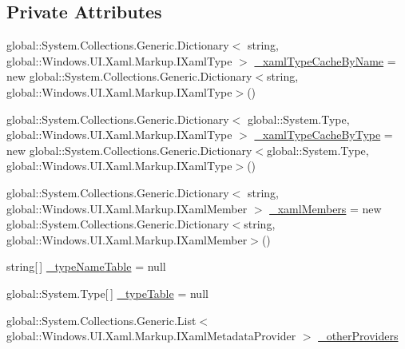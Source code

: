 \subsection*{Private Attributes}
\begin{CompactItemize}
\item 
global::System.Collections.Generic.Dictionary$<$ string, global::Windows.UI.Xaml.Markup.IXamlType $>$ \hyperlink{class__2doo_1_1_u_w_p_1_1__2doo___u_w_p___xaml_type_info_1_1_xaml_type_info_provider_5d88548b5b6d2a0898199478cd6b61a8}{\_\-xamlTypeCacheByName} = new global::System.Collections.Generic.Dictionary$<$string, global::Windows.UI.Xaml.Markup.IXamlType$>$()
\item 
global::System.Collections.Generic.Dictionary$<$ global::System.Type, global::Windows.UI.Xaml.Markup.IXamlType $>$ \hyperlink{class__2doo_1_1_u_w_p_1_1__2doo___u_w_p___xaml_type_info_1_1_xaml_type_info_provider_eba82514ea081ddecb11710f06466977}{\_\-xamlTypeCacheByType} = new global::System.Collections.Generic.Dictionary$<$global::System.Type, global::Windows.UI.Xaml.Markup.IXamlType$>$()
\item 
global::System.Collections.Generic.Dictionary$<$ string, global::Windows.UI.Xaml.Markup.IXamlMember $>$ \hyperlink{class__2doo_1_1_u_w_p_1_1__2doo___u_w_p___xaml_type_info_1_1_xaml_type_info_provider_18564e6328553bb07be6bb74e7b33eae}{\_\-xamlMembers} = new global::System.Collections.Generic.Dictionary$<$string, global::Windows.UI.Xaml.Markup.IXamlMember$>$()
\item 
string\mbox{[}$\,$\mbox{]} \hyperlink{class__2doo_1_1_u_w_p_1_1__2doo___u_w_p___xaml_type_info_1_1_xaml_type_info_provider_fb680314b765798a13cb12d18296d496}{\_\-typeNameTable} = null
\item 
global::System.Type\mbox{[}$\,$\mbox{]} \hyperlink{class__2doo_1_1_u_w_p_1_1__2doo___u_w_p___xaml_type_info_1_1_xaml_type_info_provider_067fa855f3c19999ccb575fcedfe5d50}{\_\-typeTable} = null
\item 
global::System.Collections.Generic.List$<$ global::Windows.UI.Xaml.Markup.IXamlMetadataProvider $>$ \hyperlink{class__2doo_1_1_u_w_p_1_1__2doo___u_w_p___xaml_type_info_1_1_xaml_type_info_provider_acb5175a4304dfde2dee06d4e35dd480}{\_\-otherProviders}
\end{CompactItemize}


